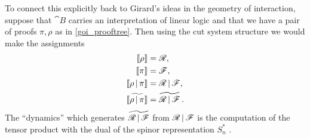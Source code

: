 \documentclass[english,letter paper,12pt,reqno]{article}
\theoremstyle{example}
\numberwithin{equation}{section}
\begin{document}
To connect this explicitly back to Girard's ideas in the geometry of interaction, suppose that $\cat{B}$ carries an interpretation of linear logic and that we have a pair of proofs $\pi, \rho$ as in \eqref{goi_prooftree}. Then using the cut system structure we would make the assignments
\begin{align*}
\llbracket \rho \rrbracket &= \mathscr{R},\\
\llbracket \pi \rrbracket &= \mathscr{F},\\
\llbracket \rho \,|\, \pi \rrbracket &= \mathscr{R} \,|\, \mathscr{F},\\
\llbracket \widetilde{\rho \,|\, \pi} \rrbracket &= \widetilde{ \mathscr{R} \,|\, \mathscr{F} }\,.
\end{align*}
The ``dynamics'' which generates $\widetilde{ \mathscr{R} \,|\, \mathscr{F} }$ from $\mathscr{R} \,|\, \mathscr{F}$ is the computation of the tensor product with the dual of the spinor representation $S_n^*$ \cite[\S 3.1]{murfet}. 
\end{document}
